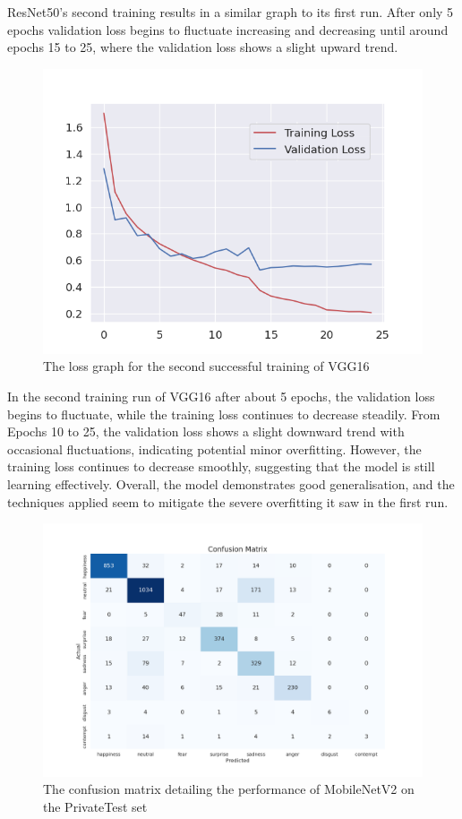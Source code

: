 ResNet50’s second training results in a similar graph to its first run. After only 5 epochs validation loss begins to fluctuate increasing and decreasing until around epochs 15 to 25, where the validation loss shows a slight upward trend.

\begin{figure}[H]
    \centering{}
    \includegraphics[scale=0.5]{fed_images/train_loss_VGG16_ofp.png}
    \caption{The loss graph for the second successful training of VGG16}
    \label{figure:loss_vgg16_ofp}
\end{figure}

In the second training run of VGG16 after about 5 epochs, the validation loss begins to fluctuate, while the training loss continues to decrease steadily. From Epochs 10 to 25, the validation loss shows a slight downward trend with occasional fluctuations, indicating potential minor overfitting. However, the training loss continues to decrease smoothly, suggesting that the model is still learning effectively. Overall, the model demonstrates good generalisation, and the techniques applied seem to mitigate the severe overfitting it saw in the first run.

\begin{figure}[H]
    \centering{}
    \includegraphics[scale=0.38]{fed_images/conf_matrix_MobileNetv2.png}
    \caption{The confusion matrix detailing the performance of MobileNetV2 on the PrivateTest set}
    \label{figure:conf_mnv2}
\end{figure}

